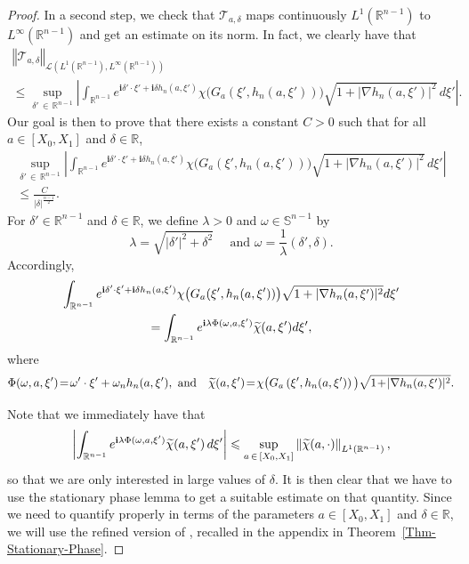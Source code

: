 \documentclass[10pt]{amsart}
\theoremstyle{definition}\newtheorem{defi}[theo]{Definition}\newtheorem{rema}[theo]{Remark}\newtheorem{exam}[theo]{Example}\newtheorem{exem}[theo]{Example}\newtheorem{nota}[theo]{Notation}
\newcommand{\scL}{\mathscr{L}}
\newcommand{\scT}{\mathscr{T}}
\newcommand*\R{\mathbb{R}}
\renewcommand*\S{\mathbb{S}}
\renewcommand{\i}{\mathbf{i}}
\newcommand{\norm}[1]{\left\Vert#1\right\Vert}
\renewcommand{\leq}{\leqslant}
\renewcommand{\tilde}{\widetilde}
\let\oldtilde\tilde
\renewcommand*{\tilde}[1]{\mathchoice{\widetilde{#1}}{\widetilde{#1}}{\oldtilde{#1}}{\oldtilde{#1}}}
\begin{document}
\begin{proof}
In a second step, we check that $\scT_{a, \delta}$ maps continuously $L^1(\R^{n-1})$ to $L^\infty(\R^{n-1})$ and get an estimate on its norm. In fact, we clearly have that
\begin{multline}\label{Est-T-a-delta-L1-Linfini}
\norm{
\scT_{a,\delta} }_{\scL\left(L^{1}\left(\R^{n-1}\right), L^\infty\left(\R^{n-1}\right)\right)} \\
\leq
\sup_{\delta'\, \in\,\R^{n-1}}
\left| \int_{\R^{n-1}} e^{\i \delta' \cdot \xi' + \i \delta h_n(a, \xi')} \chi\big(G_a(\xi', h_n(a,\xi'))\big) \sqrt{1 + |\nabla h_n(a,\xi')|^2} \, d \xi' \right|.
\end{multline}
Our goal is then to prove that there exists a constant $C>0$ such that for all $a \in [X_0, X_1]$ and $\delta \in \R$,
\begin{multline}\label{Stationary-Phase-Goal}
\sup_{\delta'\, \in\,\R^{n-1}}
\left|
\int_{\R^{n-1}} e^{\i \delta' \cdot \xi' + \i \delta h_n(a, \xi')} \chi\big(G_a(\xi', h_n(a,\xi'))\big) \sqrt{1 + \left|\nabla h_n(a,\xi')\right|^2} \, d \xi'
\right|\\
\leq
\frac{C}{|\delta|^{\frac{n-1}{2}}}.
\end{multline}
For $\delta' \in \R^{n-1}$ and $\delta \in \R$, we define $\lambda >0$ and $\omega \in \S^{n-1}$ by
\[
\lambda = \sqrt{|\delta'|^2 + \delta^2}
\quad
\text{ and }
\omega = \frac{1}{\lambda}(\delta', \delta).
\]
Accordingly,
\begin{multline*}
\int_{\R^{n-1}} e^{\i \delta' \cdot \xi' + \i \delta h_n(a, \xi')} \chi\big(G_a(\xi', h_n(a,\xi'))\big) \sqrt{1 + |\nabla h_n(a,\xi')|^2} d \xi'\\
= 
\int_{\R^{n-1}}  e^{\i \lambda \Phi(\omega, a, \xi')} \tilde \chi(a,\xi') d \xi',
\end{multline*}
where
\begin{equation*}
\Phi(\omega, a, \xi')\! = \!\omega' \cdot \xi' + \omega_n h_n(a, \xi'),
\text{ and} 
\quad
\tilde \chi(a,\xi')\! =\! \chi\big(G_a\left(\xi', h_n(a,\xi')\right)\big) \sqrt{1 \!+\! |\nabla h_n(a,\xi')|^2}.
\end{equation*}


Note that we immediately have that
\begin{equation}\label{Stationary-Phase-Goal-0}
\left| \int_{\R^{n-1}} e^{\i \lambda \Phi(\omega, a, \xi')} \tilde \chi(a,\xi') \, d \xi'\right|
\leq \sup_{a\, \in\,[X_0,X_1]} \left\|\tilde \chi(a, \cdot) \right\|_{L^1\left(\R^{n-1}\right)},
\end{equation}
so that we are only interested in large values of $\delta$. It is then clear that we have to use the stationary phase lemma to get a suitable estimate on that quantity. Since we need to quantify properly in terms of the parameters $a \in [X_0,X_1]$ and $\delta \in \R$, we will use the refined version of {\cite[Theorem~1]{alazard2017stationary}}, recalled in the appendix in Theorem~\ref{Thm-Stationary-Phase}.




\end{proof}
\end{document}
